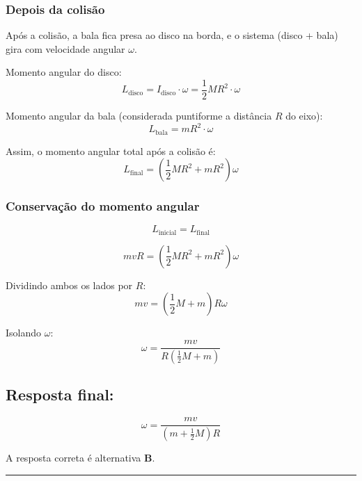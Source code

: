 \documentclass[a4paper,12pt]{article}
\begin{document}
\begin{flushleft}
\subsubsection*{Depois da colisão}
Após a colisão, a bala fica presa ao disco na borda, e o sistema (disco + bala) gira com velocidade angular \(\omega\).

Momento angular do disco:
\[
L_{\text{disco}} = I_{\text{disco}} \cdot \omega = \frac{1}{2} M R^2 \cdot \omega
\]

Momento angular da bala (considerada puntiforme a distância \(R\) do eixo):
\[
L_{\text{bala}} = m R^2 \cdot \omega
\]

Assim, o momento angular total após a colisão é:
\[
L_{\text{final}} = \left( \frac{1}{2} M R^2 + m R^2 \right) \omega
\]

\subsubsection*{Conservação do momento angular}
\[
L_{\text{inicial}} = L_{\text{final}}
\]

\[
m v R = \left( \frac{1}{2} M R^2 + m R^2 \right) \omega
\]

Dividindo ambos os lados por \(R\):
\[
m v = \left( \frac{1}{2} M + m \right) R \omega
\]

Isolando \(\omega\):
\[
\omega = \frac{m v}{R \left( \frac{1}{2} M + m \right)}
\]

\subsection*{Resposta final:}
\[
\boxed{
\omega = \frac{m v}{\left(m + \frac{1}{2} M\right)R}
}
\]

A resposta correta é alternativa \colorbox{green!50}{\textbf{B}}.
\end{flushleft}

\noindent\rule{\linewidth}{0.6pt}\\
\end{document}
